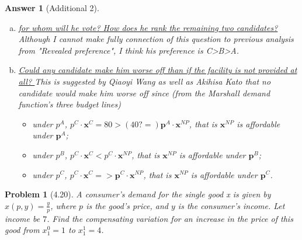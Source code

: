 \documentclass{article}
\newtheorem*{ans}{Answer}
\newtheorem*{prob}{{\bf Problem}}
\newcommand{\1}{{\bf 1}}
\newcommand{\0}{{\mathbf{0}}}
\newcommand{\p}{{\mathbf{p}}}
\newcommand{\x}{{\mathbf{x}}}
\newcommand{\<}{\langle}
\renewcommand{\>}{\rangle}
\begin{document}
\begin{ans}[Additional 2]
\begin{enumerate}[(a)]
	\item  \ul{ for whom will he vote? How does he rank the remaining two candidates?} Although I cannot make fully connection of this question to previous analysis from "Revealed preference", I think his preference is C>B>A.
	\item \ul{ 	Could any candidate make him worse off than if the facility is not provided at all? } This is suggested by Qiaoyi Wang as well as Akihisa Kato that no candidate would make him worse off since (from the Marshall demand function's three budget lines)
	\begin{itemize}
		\item under $p^A$, $p^C \cdot \x^C = 80 > (40? = )\p^A \cdot \x^{NP}$, that is $\x^{NP}$ is affordable under $\p^A$;
\item 		under $p^B$, $p^C \cdot \x^C<p^C \cdot \x^{NP}$, that is $\x^{NP}$ is affordable under $\p^B$;
		\item under $p^C$, $p^C \cdot \x^C = > \p^C \cdot \x^{NP}$, that is $\x^{NP}$ is affordable under $\p^C$.
	\end{itemize}
\end{enumerate}
\end{ans}

\begin{prob}[4.20]
A consumer’s demand for the single good x is given by $ x(p, y) = \frac{y}{p}$, where $p$ is the good’s price, and $y$ is the consumer’s income. Let income be $7$. Find the compensating variation for an increase in the price of this good from $x^0_1= 1$ to $x^1_1=  4$.
\end{prob}
\end{document}
